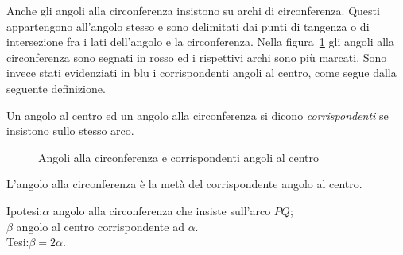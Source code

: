 Anche gli angoli alla circonferenza insistono su archi di circonferenza. Questi appartengono all'angolo stesso e sono delimitati dai punti di tangenza o di intersezione fra i lati dell'angolo e la circonferenza. Nella figura~\ref{fig:ang_circonf} gli angoli alla circonferenza sono segnati in rosso ed i rispettivi archi sono più marcati. Sono invece stati evidenziati in blu i corrispondenti angoli al centro, come segue dalla seguente definizione.

\begin{definizione}
	Un angolo al centro ed un angolo alla circonferenza si dicono \emph{corrispondenti} se insistono sullo stesso arco.
\end{definizione}

\begin{figure}[htb]\label{fig:ang_circonf}
	\centering
	\caption{Angoli alla circonferenza e corrispondenti angoli al centro}
\end{figure}

\pagebreak

\begin{teorema}
L'angolo alla circonferenza è la metà del corrispondente angolo al centro.
\end{teorema}

\noindent Ipotesi:\tab $\alpha$ angolo alla circonferenza che insiste sull'arco $PQ$;\\
\tab\tab $\beta$ angolo al centro corrispondente ad $\alpha$.\vspace{4pt}\\
Tesi:\tab $\beta = 2\alpha$.


